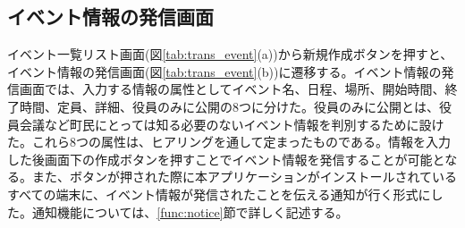 \subsection{イベント情報の発信画面}%
イベント一覧リスト画面(図\ref{tab:trans_event}(a))から新規作成ボタンを押すと、イベント情報の発信画面(図\ref{tab:trans_event}(b))に遷移する。イベント情報の発信画面では、入力する情報の属性としてイベント名、日程、場所、開始時間、終了時間、定員、詳細、役員のみに公開の8つに分けた。役員のみに公開とは、役員会議など町民にとっては知る必要のないイベント情報を判別するために設けた。これら8つの属性は、ヒアリングを通して定まったものである。情報を入力した後画面下の作成ボタンを押すことでイベント情報を発信することが可能となる。また、ボタンが押された際に本アプリケーションがインストールされているすべての端末に、イベント情報が発信されたことを伝える通知が行く形式にした。通知機能については、\ref{func:notice}節で詳しく記述する。

